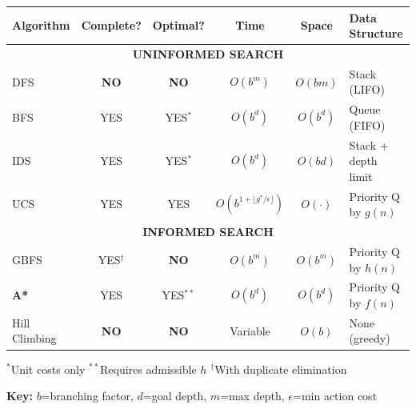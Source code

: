 \documentclass[11pt,a4paper]{article}
\begin{document}
\begin{definitionbox}
\begin{center}
\begin{tabular}{@{}lccccl@{}}
\toprule
\textbf{Algorithm} & \textbf{Complete?} & \textbf{Optimal?} & \textbf{Time} & \textbf{Space} & \textbf{Data Structure} \\
\midrule
\multicolumn{6}{c}{\textbf{UNINFORMED SEARCH}} \\
\midrule
DFS & \textbf{NO} & \textbf{NO} & $O(b^m)$ & $O(bm)$ & Stack (LIFO) \\
BFS & YES & YES$^*$ & $O(b^d)$ & $O(b^d)$ & Queue (FIFO) \\
IDS & YES & YES$^*$ & $O(b^d)$ & $O(bd)$ & Stack + depth limit \\
UCS & YES & YES & $O(b^{1+\lfloor g^*/\epsilon\rfloor})$ & $O(\cdot)$ & Priority Q by $g(n)$ \\
\midrule
\multicolumn{6}{c}{\textbf{INFORMED SEARCH}} \\
\midrule
GBFS & YES$^\dagger$ & \textbf{NO} & $O(b^m)$ & $O(b^m)$ & Priority Q by $h(n)$ \\
\textbf{A*} & YES & YES$^{**}$ & $O(b^d)$ & $O(b^d)$ & Priority Q by $f(n)$ \\
Hill Climbing & \textbf{NO} & \textbf{NO} & Variable & $O(b)$ & None (greedy) \\
\bottomrule
\end{tabular}
\end{center}
$^*$Unit costs only \quad $^{**}$Requires admissible $h$ \quad $^\dagger$With duplicate elimination

\textbf{Key:} $b$=branching factor, $d$=goal depth, $m$=max depth, $\epsilon$=min action cost
\end{definitionbox}
\end{document}
